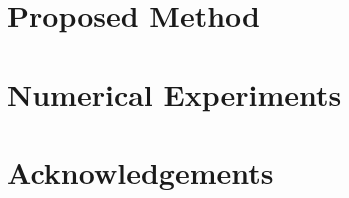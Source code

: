 


\chapter{Proposed Method}


\chapter{Numerical Experiments}


\chapter*{Acknowledgements}

\newpage

\renewcommand{\bibname}{References}


{}



